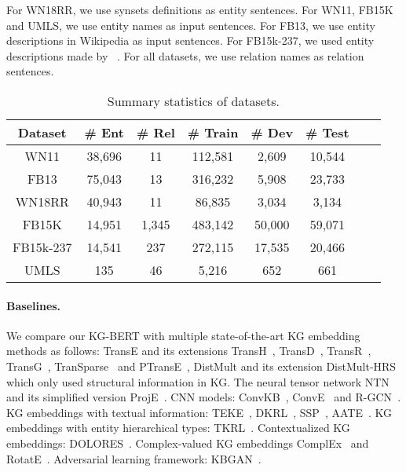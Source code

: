 \documentclass[letterpaper]{article} \usepackage{aaai20}  \usepackage{times}  \usepackage{helvet} \usepackage{courier}  \usepackage[hyphens]{url}  \usepackage{graphicx} \urlstyle{rm} \def\UrlFont{\rm}  \usepackage{graphicx}  \usepackage{amsmath}
\begin{document}
For WN18RR, we use synsets definitions as entity sentences. For WN11, FB15K and UMLS, we use entity names as input sentences. For FB13, we use entity descriptions in Wikipedia as input sentences. For FB15k-237, we used entity descriptions made by ~\cite{xie2016representation}. For all datasets, we use relation names as relation sentences.

    {\small
    \begin{table}[t]\footnotesize
    \centering
    \renewcommand{\arraystretch}{1.2}

    \begin{tabular}{c|ccccccc}
    \hline
    \bf{Dataset}& \bf{\# Ent}	& \bf{\# Rel}& \bf{\# Train}& \bf{\# Dev} & \bf{\# Test} \\
    \hline
    WN11 & 38,696 & 11 & 112,581 & 2,609  & 10,544\\ FB13 & 75,043  & 13 & 316,232 & 5,908 & 23,733 \\
    WN18RR& 40,943 & 11 & 86,835 & 3,034 & 3,134\\
    FB15K& 14,951 & 1,345 & 483,142 & 50,000 & 59,071 \\
    FB15k-237& 14,541 & 237 & 272,115 & 17,535 & 20,466\\
    UMLS & 135 & 46 & 5,216 & 652 & 661\\
    \hline
    \end{tabular}
    \caption{Summary statistics of datasets.}
    \label{tab:statistics}
    \end{table}
    }
    


\paragraph{Baselines.}
We compare our KG-BERT with multiple state-of-the-art KG embedding methods as follows: TransE and its extensions TransH~\cite{wang2014knowledge}, TransD~\cite{ji2015knowledge}, TransR~\cite{lin2015learning}, TransG~\cite{xiao2016transg}, TranSparse~\cite{ji2016knowledge} and PTransE~\cite{lin2015modeling}, DistMult and its extension DistMult-HRS~\cite{zhang2018knowledge} which only used structural information in KG. The neural tensor network NTN~\cite{socher2013reasoning} and its simplified version ProjE~\cite{shi2017proje}. CNN models: ConvKB~\cite{SWJ318}, ConvE~\cite{dettmers2018convolutional} and R-GCN~\cite{schlichtkrull2018modeling}. KG embeddings with textual information: TEKE~\cite{wang2016text}, DKRL~\cite{xie2016representation}, SSP~\cite{xiao2017ssp}, AATE~\cite{an2018accurate}. KG embeddings with entity hierarchical types: TKRL~\cite{xie2016representationijcai}. Contextualized KG embeddings: DOLORES~\cite{wang2018dolores}. Complex-valued KG embeddings ComplEx~\cite{trouillon2016complex} and RotatE~\cite{sun2019rotate}. Adversarial learning framework: KBGAN~\cite{cai2018kbgan}. 
\end{document}
